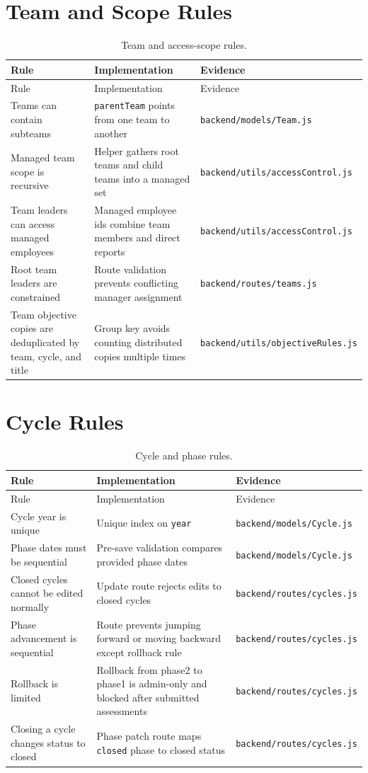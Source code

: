 \section{Team and Scope Rules}
\begin{longtable}{p{}p{}p{}}
\caption{Team and access-scope rules.}\label{tab:team-rules}\\
\toprule
Rule & Implementation & Evidence\\
\midrule
\endfirsthead
\toprule
Rule & Implementation & Evidence\\
\midrule
\endhead
Teams can contain subteams & \texttt{parentTeam} points from one team to another & \texttt{backend/models/Team.js}\\
Managed team scope is recursive & Helper gathers root teams and child teams into a managed set & \texttt{backend/utils/accessControl.js}\\
Team leaders can access managed employees & Managed employee ids combine team members and direct reports & \texttt{backend/utils/accessControl.js}\\
Root team leaders are constrained & Route validation prevents conflicting manager assignment & \texttt{backend/routes/teams.js}\\
Team objective copies are deduplicated by team, cycle, and title & Group key avoids counting distributed copies multiple times & \texttt{backend/utils/objectiveRules.js}\\
\bottomrule
\end{longtable}

\section{Cycle Rules}
\begin{longtable}{p{}p{}p{}}
\caption{Cycle and phase rules.}\label{tab:cycle-rules}\\
\toprule
Rule & Implementation & Evidence\\
\midrule
\endfirsthead
\toprule
Rule & Implementation & Evidence\\
\midrule
\endhead
Cycle year is unique & Unique index on \texttt{year} & \texttt{backend/models/Cycle.js}\\
Phase dates must be sequential & Pre-save validation compares provided phase dates & \texttt{backend/models/Cycle.js}\\
Closed cycles cannot be edited normally & Update route rejects edits to closed cycles & \texttt{backend/routes/cycles.js}\\
Phase advancement is sequential & Route prevents jumping forward or moving backward except rollback rule & \texttt{backend/routes/cycles.js}\\
Rollback is limited & Rollback from phase2 to phase1 is admin-only and blocked after submitted assessments & \texttt{backend/routes/cycles.js}\\
Closing a cycle changes status to closed & Phase patch route maps \texttt{closed} phase to closed status & \texttt{backend/routes/cycles.js}\\
\bottomrule
\end{longtable}

